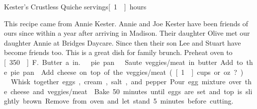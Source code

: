\begin{recipe}{Kester's Crustless Quiche}
{\unit[6]{servings}}{\unit[1]{hours}}

\freeform This recipe came from Annie Kester. Annie and Joe Kester have been
friends of ours since within a year after arriving in Madison. Their daughter
Olive met our daughter Annie at Bridges Daycare. Since then their son
Lee and Stuart have become friends too. This is a great dish for
family brunch. Preheat oven to \unit[350\0]{F.} Butter a \unit[9]{in.}\
pie pan.

Saute veggies/meat in butter. Add to the pie pan.
Add cheese on top of the veggies/meat. (\unit[1\fr12]{cups} or \unit[6]{oz}?)
\ing[6]{}{eggs}
Whisk together eggs, cream, salt, and pepper. Pour egg mixture over
the cheese and veggies/meat.
\freeform Bake 50 minutes until eggs are set and top is
slightly brown.  Remove from oven and let stand 5 minutes before
cutting.
\end{recipe}
